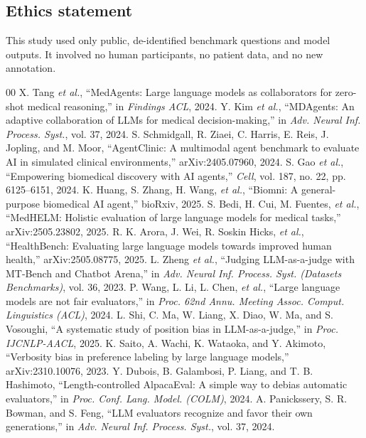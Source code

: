 \documentclass[conference]{IEEEtran}
\begin{document}
\subsection*{Ethics statement}
This study used only public, de-identified benchmark questions and model outputs. It involved no human participants, no patient data, and no new annotation.

\begin{thebibliography}{00}
 X. Tang \textit{et al.}, ``MedAgents: Large language models as collaborators for zero-shot medical reasoning,'' in \textit{Findings ACL}, 2024.
 Y. Kim \textit{et al.}, ``MDAgents: An adaptive collaboration of LLMs for medical decision-making,'' in \textit{Adv. Neural Inf. Process. Syst.}, vol. 37, 2024.
 S. Schmidgall, R. Ziaei, C. Harris, E. Reis, J. Jopling, and M. Moor, ``AgentClinic: A multimodal agent benchmark to evaluate AI in simulated clinical environments,'' arXiv:2405.07960, 2024.
 S. Gao \textit{et al.}, ``Empowering biomedical discovery with AI agents,'' \textit{Cell}, vol. 187, no. 22, pp. 6125--6151, 2024.
 K. Huang, S. Zhang, H. Wang, \textit{et al.}, ``Biomni: A general-purpose biomedical AI agent,'' bioRxiv, 2025.
 S. Bedi, H. Cui, M. Fuentes, \textit{et al.}, ``MedHELM: Holistic evaluation of large language models for medical tasks,'' arXiv:2505.23802, 2025.
 R. K. Arora, J. Wei, R. Soskin Hicks, \textit{et al.}, ``HealthBench: Evaluating large language models towards improved human health,'' arXiv:2505.08775, 2025.
 L. Zheng \textit{et al.}, ``Judging LLM-as-a-judge with MT-Bench and Chatbot Arena,'' in \textit{Adv. Neural Inf. Process. Syst. (Datasets Benchmarks)}, vol. 36, 2023.
 P. Wang, L. Li, L. Chen, \textit{et al.}, ``Large language models are not fair evaluators,'' in \textit{Proc. 62nd Annu. Meeting Assoc. Comput. Linguistics (ACL)}, 2024.
 L. Shi, C. Ma, W. Liang, X. Diao, W. Ma, and S. Vosoughi, ``A systematic study of position bias in LLM-as-a-judge,'' in \textit{Proc. IJCNLP-AACL}, 2025.
 K. Saito, A. Wachi, K. Wataoka, and Y. Akimoto, ``Verbosity bias in preference labeling by large language models,'' arXiv:2310.10076, 2023.
 Y. Dubois, B. Galambosi, P. Liang, and T. B. Hashimoto, ``Length-controlled AlpacaEval: A simple way to debias automatic evaluators,'' in \textit{Proc. Conf. Lang. Model. (COLM)}, 2024.
 A. Panickssery, S. R. Bowman, and S. Feng, ``LLM evaluators recognize and favor their own generations,'' in \textit{Adv. Neural Inf. Process. Syst.}, vol. 37, 2024.

\end{thebibliography}
\end{document}
